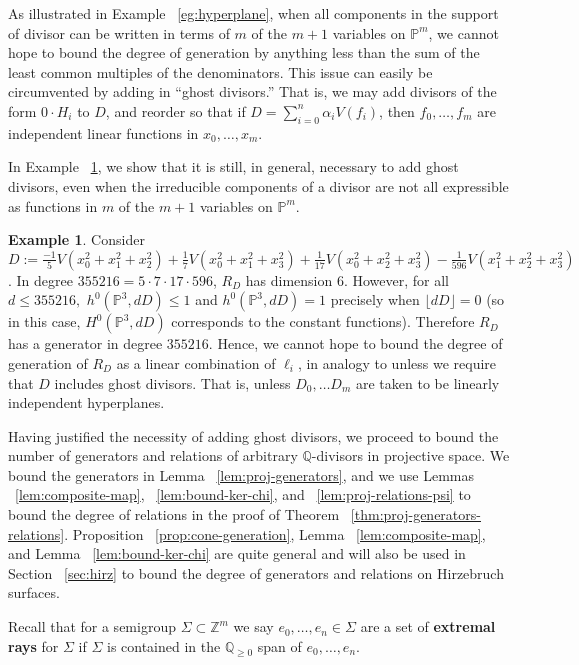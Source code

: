 \documentclass{amsart}
\theoremstyle{plain}
\theoremstyle{definition}
\newtheorem{example}[thm]{Example}
\theoremstyle{remark}
\numberwithin{equation}{subsection}
\newcommand\bq{{\mathbb Q}}
\newcommand\bp{{\mathbb P}}
\newcommand\bz{{\mathbb Z}}
\begin{document}
As illustrated in Example ~\ref{eg:hyperplane}, 
when all components in the support of divisor can be 
written in terms of $m$ of the $m+1$ variables on $\bp^m$,
we cannot hope to bound the degree of generation
by anything less than the sum of the least common multiples of
the denominators. This issue can easily be circumvented by adding in ``ghost
divisors.'' That is, we may add divisors of the form $0 \cdot H_i$ to
$D$, and reorder so that if $D = \sum_{i=0}^{n}\alpha_i V(f_i)$,
then $f_0, \ldots, f_m$ are independent linear functions in
$x_0,\ldots, x_m$.

In Example ~\ref{eg:radical}, we show that it is still, in general,
necessary to add ghost divisors, even when the irreducible components
of a divisor are not all
expressible as functions in $m$ of the $m+1$ variables on $\bp^m$.

\begin{example}
\label{eg:radical}
Consider $D :=\frac{-1}{5}V(x_0^2 + x_1^2 + x_2^2) + \frac{1}{7}V(x_0^2 + x_1^2 +
x_3^2) + \frac{1}{17}V(x_0^2 + x_2^2 + x_3^2) - \frac{1}{596}V(x_1^2 + x_2^2 +
x_3^2)$. In degree $355216 = 5 \cdot 7 \cdot 17 \cdot 596$, $R_D$ has dimension
$6$.
However, for all $d \leq 355216,$ $h^0(\bp^3, dD) \leq 1$
and 
$h^0(\bp^3, dD)  = 1$ precisely when $\lfloor d D \rfloor = 0$ 
(so in this case, $H^0(\bp^3, d D)$ corresponds to the constant functions).
Therefore $R_D$ has a generator in degree $355216$.
Hence, we cannot hope to bound the degree
of generation of $R_D$ as a linear combination of $\ell_i$,
in analogy to \cite[Theorem 8]{dorney:canonical}
unless we require that $D$ includes ghost divisors. That is, unless
$D_0,\ldots D_m$ are taken to be linearly independent hyperplanes.
\end{example}

Having justified the necessity of adding ghost divisors, we proceed to bound the
number of generators and relations of arbitrary $\bq$-divisors in 
projective space. We bound the generators in Lemma ~\ref{lem:proj-generators}, and we use Lemmas ~\ref{lem:composite-map}, ~\ref{lem:bound-ker-chi}, and ~\ref{lem:proj-relations-psi} to bound the 
degree of relations in the proof of Theorem ~\ref{thm:proj-generators-relations}. Proposition ~\ref{prop:cone-generation}, Lemma ~\ref{lem:composite-map}, and Lemma ~\ref{lem:bound-ker-chi} are quite 
general and will also be used in Section ~\ref{sec:hirz} to bound the 
degree of generators and relations on Hirzebruch surfaces.

Recall that for a semigroup $\Sigma \subset \bz^m$ we say $e_0, \ldots, e_n \in \Sigma$ are a set of {\bf extremal rays}
for $\Sigma$ if 
$\Sigma$ is contained in the $\bq_{\geq 0}$ span of
$e_0, \ldots, e_n$.
\end{document}
